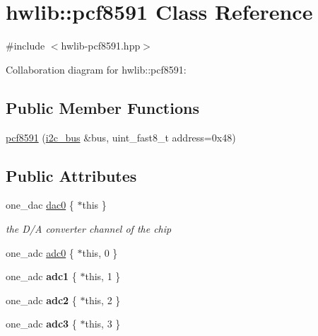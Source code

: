 \hypertarget{classhwlib_1_1pcf8591}{}\section{hwlib\+:\+:pcf8591 Class Reference}
\label{classhwlib_1_1pcf8591}


{\ttfamily \#include $<$hwlib-\/pcf8591.\+hpp$>$}



Collaboration diagram for hwlib\+:\+:pcf8591\+:
\subsection*{Public Member Functions}
\begin{DoxyCompactItemize}
\item 
\hyperlink{classhwlib_1_1pcf8591_abcaa1f0b67d70cd95754fd02a939240b}{pcf8591} (\hyperlink{classhwlib_1_1i2c__bus}{i2c\+\_\+bus} \&bus, uint\+\_\+fast8\+\_\+t address=0x48)
\end{DoxyCompactItemize}
\subsection*{Public Attributes}
\begin{DoxyCompactItemize}
\item 
\mbox{\label{classhwlib_1_1pcf8591_a49118bd1d284d0e72aca58558b854b2d}} 
one\+\_\+dac \hyperlink{classhwlib_1_1pcf8591_a49118bd1d284d0e72aca58558b854b2d}{dac0} \{ $\ast$this \}
\begin{DoxyCompactList}\small\item\em the D/A converter channel of the chip \end{DoxyCompactList}\end{DoxyCompactItemize}
\textbf{ }\par
\begin{DoxyCompactItemize}
\item 
one\+\_\+adc \hyperlink{classhwlib_1_1pcf8591_a29a87f5711fbbd85ed5c477a5eab1b6f}{adc0} \{ $\ast$this, 0 \}
\item 
\mbox{\label{classhwlib_1_1pcf8591_aa916285265761457b7c95207d2b41118}} 
one\+\_\+adc {\bfseries adc1} \{ $\ast$this, 1 \}
\item 
\mbox{\label{classhwlib_1_1pcf8591_acb459e70a386e9b62fb0680ea5e84cfb}} 
one\+\_\+adc {\bfseries adc2} \{ $\ast$this, 2 \}
\item 
\mbox{\label{classhwlib_1_1pcf8591_aa89be33b4b8d5a329120e867e8d8245f}} 
one\+\_\+adc {\bfseries adc3} \{ $\ast$this, 3 \}
\end{DoxyCompactItemize}



